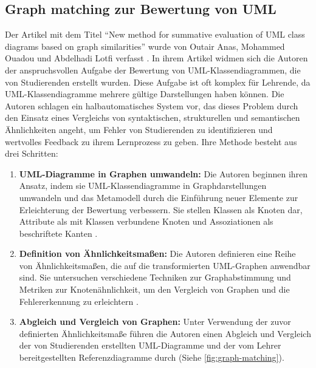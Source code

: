 \subsection{Graph matching zur Bewertung von UML}

Der Artikel mit dem Titel ``New method for summative evaluation of UML class diagrams based on graph similarities'' wurde von Outair Anas, Mohammed Ouadou und Abdelhadi Lotfi verfasst \cite{anas2021new}. In ihrem Artikel widmen sich die Autoren der anspruchsvollen Aufgabe der Bewertung von UML-Klassendiagrammen, die von Studierenden erstellt wurden. Diese Aufgabe ist oft komplex für Lehrende, da UML-Klassendiagramme mehrere gültige Darstellungen haben können. Die Autoren schlagen ein halbautomatisches System vor, das dieses Problem durch den Einsatz eines Vergleichs von syntaktischen, strukturellen und semantischen Ähnlichkeiten angeht, um Fehler von Studierenden zu identifizieren und wertvolles Feedback zu ihrem Lernprozess zu geben. Ihre Methode besteht aus drei Schritten: 

\begin{enumerate}
    \item \textbf{UML-Diagramme in Graphen umwandeln:} Die Autoren beginnen ihren Ansatz, indem sie UML-Klassendiagramme in Graphdarstellungen umwandeln und das Metamodell durch die Einführung neuer Elemente zur Erleichterung der Bewertung verbessern. Sie stellen Klassen als Knoten dar, Attribute als mit Klassen verbundene Knoten und Assoziationen als beschriftete Kanten \cite{auxepaules2015diagram}.

    \item \textbf{Definition von Ähnlichkeitsmaßen:} Die Autoren definieren eine Reihe von Ähnlichkeitsmaßen, die auf die transformierten UML-Graphen anwendbar sind. Sie untersuchen verschiedene Techniken zur Graphabstimmung und Metriken zur Knotenähnlichkeit, um den Vergleich von Graphen und die Fehlererkennung zu erleichtern \cite{fauzan2018class}.

    \item \textbf{Abgleich und Vergleich von Graphen:} Unter Verwendung der zuvor definierten Ähnlichkeitsmaße führen die Autoren einen Abgleich und Vergleich der von Studierenden erstellten UML-Diagramme und der vom Lehrer bereitgestellten Referenzdiagramme durch \cite{outair2017towards} (Siehe \ref{fig:graph-matching}).
\end{enumerate}


